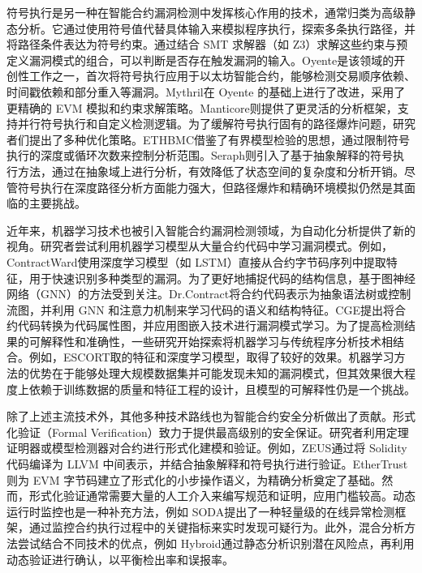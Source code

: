 \documentclass[print, master, vlined, timesmath]{DissertUESTC}
\begin{document}
符号执行是另一种在智能合约漏洞检测中发挥核心作用的技术，通常归类为高级静态分析。它通过使用符号值代替具体输入来模拟程序执行，探索多条执行路径，并将路径条件表达为符号约束。通过结合 SMT 求解器（如 Z3\textsuperscript{\cite{Z3}}）求解这些约束与预定义漏洞模式的组合，可以判断是否存在触发漏洞的输入。Oyente\textsuperscript{\cite{luu2016making}}是该领域的开创性工作之一，首次将符号执行应用于以太坊智能合约，能够检测交易顺序依赖、时间戳依赖和部分重入等漏洞。Mythril在 Oyente 的基础上进行了改进，采用了更精确的 EVM 模拟和约束求解策略。Manticore\textsuperscript{\cite{Mossberg2019ma}}则提供了更灵活的分析框架，支持并行符号执行和自定义检测逻辑。为了缓解符号执行固有的路径爆炸问题，研究者们提出了多种优化策略。ETHBMC\textsuperscript{\cite{frank2020ethbmc}}借鉴了有界模型检验的思想，通过限制符号执行的深度或循环次数来控制分析范围。Seraph\textsuperscript{\cite{yang2020seraph}}则引入了基于抽象解释的符号执行方法，通过在抽象域上进行分析，有效降低了状态空间的复杂度和分析开销。尽管符号执行在深度路径分析方面能力强大，但路径爆炸和精确环境模拟仍然是其面临的主要挑战\textsuperscript{\cite{perez2023survey}}。

近年来，机器学习技术也被引入智能合约漏洞检测领域，为自动化分析提供了新的视角。研究者尝试利用机器学习模型从大量合约代码中学习漏洞模式。例如，ContractWard\textsuperscript{\cite{wang2020contractward}}使用深度学习模型（如 LSTM）直接从合约字节码序列中提取特征，用于快速识别多种类型的漏洞。为了更好地捕捉代码的结构信息，基于图神经网络（GNN）的方法受到关注。Dr.Contract将合约代码表示为抽象语法树或控制流图，并利用 GNN 和注意力机制来学习代码的语义和结构特征。CGE\textsuperscript{\cite{zhai2024smart}}提出将合约代码转换为代码属性图，并应用图嵌入技术进行漏洞模式学习。为了提高检测结果的可解释性和准确性，一些研究开始探索将机器学习与传统程序分析技术相结合。例如，ESCORT\textsuperscript{\cite{gao2020escort}}取的特征和深度学习模型，取得了较好的效果。机器学习方法的优势在于能够处理大规模数据集并可能发现未知的漏洞模式，但其效果很大程度上依赖于训练数据的质量和特征工程的设计，且模型的可解释性仍是一个挑战。


除了上述主流技术外，其他多种技术路线也为智能合约安全分析做出了贡献。形式化验证（Formal Verification）致力于提供最高级别的安全保证。研究者利用定理证明器或模型检测器对合约进行形式化建模和验证\textsuperscript{\cite{grishchenko2018semantic}}\textsuperscript{\cite{bhargavan2016formal}}。例如，ZEUS\textsuperscript{\cite{kalra2018zeus}}通过将 Solidity 代码编译为 LLVM 中间表示，并结合抽象解释和符号执行进行验证。EtherTrust\textsuperscript{\cite{albert2018ethertrust}}则为 EVM 字节码建立了形式化的小步操作语义，为精确分析奠定了基础。然而，形式化验证通常需要大量的人工介入来编写规范和证明，应用门槛较高。动态运行时监控也是一种补充方法，例如 SODA\textsuperscript{\cite{chen2020soda}}提出了一种轻量级的在线异常检测框架，通过监控合约执行过程中的关键指标来实时发现可疑行为。此外，混合分析方法尝试结合不同技术的优点，例如 Hybroid\textsuperscript{\cite{qian2022hybroid}}通过静态分析识别潜在风险点，再利用动态验证进行确认，以平衡检出率和误报率。
\end{document}
